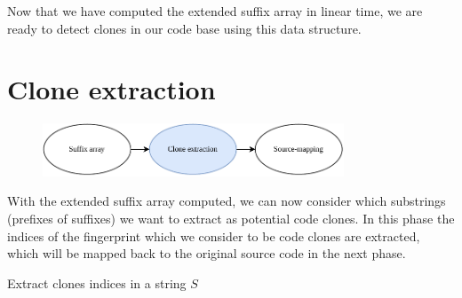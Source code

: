 Now that we have computed the extended suffix array in linear time, we are ready to detect
clones in our code base using this data structure.

\section{Clone extraction}

\begin{figure}[H]
    \begin{center}
        \includegraphics[width=0.8\textwidth]{figures/phases/phases_cloneextraction.drawio.pdf}
    \end{center}
\end{figure}

With the extended suffix array computed, we can now consider which substrings (prefixes of
suffixes) we want to extract as potential code clones. In this phase the indices of the
fingerprint which we consider to be code clones are extracted, which will be mapped back
to the original source code in the next phase.

\begin{algorithm}[t]
  \SetAlgoLined\DontPrintSemicolon

  \vspace{0.5cm}
  \caption{Extract clones indices in a string $S$}
  \label{alg:simplecloneextraction}
\end{algorithm}

